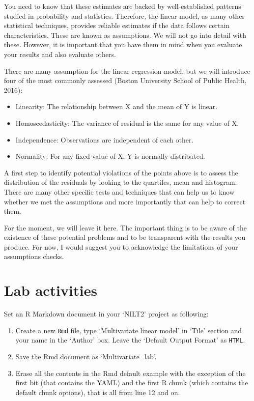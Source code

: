 \documentclass[
]{book}
\providecommand{\tightlist}{%
  \setlength{\itemsep}{0pt}\setlength{\parskip}{0pt}}
\begin{document}
You need to know that these estimates are backed by well-established patterns studied in probability and statistics. Therefore, the linear model, as many other statistical techniques, provides reliable estimates if the data follows certain characteristics. These are known as assumptions. We will not go into detail with these. However, it is important that you have them in mind when you evaluate your results and also evaluate others.

There are many assumption for the linear regression model, but we will introduce four of the most commonly assessed (Boston University School of Public Health, 2016):

\begin{itemize}
\tightlist
\item
  Linearity: The relationship between X and the mean of Y is linear.
\item
  Homoscedasticity: The variance of residual is the same for any value of X.
\item
  Independence: Observations are independent of each other.
\item
  Normality: For any fixed value of X, Y is normally distributed.
\end{itemize}

A first step to identify potential violations of the points above is to assess the distribution of the residuals by looking to the quartiles, mean and histogram. There are many other specific tests and techniques that can help us to know whether we met the assumptions and more importantly that can help to correct them.

For the moment, we will leave it here. The important thing is to be aware of the existence of these potential problems and to be transparent with the results you produce. For now, I would suggest you to acknowledge the limitations of your assumptions checks.

\hypertarget{lab-activities-1}{%
\section{Lab activities}\label{lab-activities-1}}

Set an R Markdown document in your `NILT2' project as following:

\begin{enumerate}
\def\labelenumi{\arabic{enumi}.}
\tightlist
\item
  Create a new \texttt{Rmd} file, type `Multivariate linear model' in `Tile' section and your name in the `Author' box. Leave the `Default Output Format' as \texttt{HTML}.
\item
  Save the Rmd document as `Multivariate\_lab'.
\item
  Erase all the contents in the Rmd default example with the exception of the first bit (that contains the YAML) and the first R chunk (which contains the default chunk options), that is all from line 12 and on.
\end{enumerate}
\end{document}
